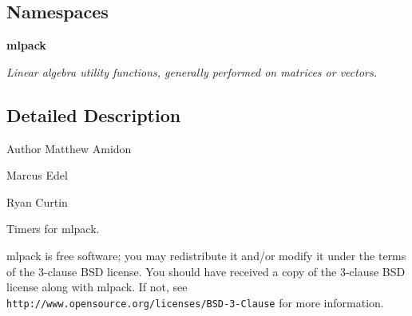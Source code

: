 \subsection*{Namespaces}
\begin{DoxyCompactItemize}
\item 
 \textbf{ mlpack}
\begin{DoxyCompactList}\small\item\em Linear algebra utility functions, generally performed on matrices or vectors. \end{DoxyCompactList}\end{DoxyCompactItemize}


\subsection{Detailed Description}
\begin{DoxyAuthor}{Author}
Matthew Amidon 

Marcus Edel 

Ryan Curtin
\end{DoxyAuthor}
Timers for mlpack.

mlpack is free software; you may redistribute it and/or modify it under the terms of the 3-\/clause B\+SD license. You should have received a copy of the 3-\/clause B\+SD license along with mlpack. If not, see {\tt http\+://www.\+opensource.\+org/licenses/\+B\+S\+D-\/3-\/\+Clause} for more information. 